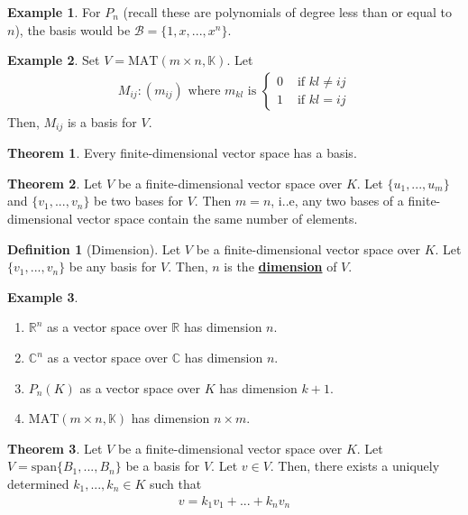 \documentclass[11pt]{scrartcl}
\newcommand{\R}[0]{\mathbb{R}}
\theoremstyle{definition}
\newtheorem{theorem}{Theorem}
\newtheorem{definition}{Definition}
\newtheorem{ex}{Example}
\theoremstyle{remark}
\newcommand{\dfn}[1]{\textbf{\underline{#1}}}
\newcommand{\C}[0]{\mathbb{C}}
\newcommand{\mat}[1]{\text{MAT}(m \times n, \mathbb{#1})}
\begin{document}
\begin{ex} 
	For $P_n$ (recall these are polynomials of degree less than or equal to $n$), the basis would be $\mathcal{B} = \{ 1, x, ..., x^n \}$. 
\end{ex}

\begin{ex} 
	Set $V = \mat{K}$. Let 
	\begin{align}
		M_{ij}: (m_{ij}) \text{ where } m_{kl} \text{ is } \begin{cases}
			0 & \text{ if } kl  \neq ij \\
			1 & \text{ if } kl = ij
		\end{cases}	
	\end{align}
	Then, $M_{ij}$ is a basis for $V$. 
\end{ex}

\begin{theorem}
	Every finite-dimensional vector space has a basis. 
\end{theorem}

\begin{theorem}
	Let $V$ be a finite-dimensional vector space over $K$. Let $\{ u_1, ..., u_m \}$ and $ \{ v_1, ..., v_n \}$ be two bases for $V$. Then $m=n$, i..e, any two bases of a finite-dimensional vector space contain the same number of elements.  
\end{theorem}

\begin{definition}[Dimension]
	Let $V$ be a finite-dimensional vector space over $K$. Let $\{ v_1, ..., v_n \}$ be any basis for $V$. Then, $n$ is the \dfn{dimension} of $V$. 
\end{definition}

\begin{ex}
	\begin{enumerate}[noitemsep]
		\item $\R^n$ as a vector space over $\R$ has dimension $n$. 
		\item $\C^n$ as a vector space over $\C$ has dimension $n$. 
		\item $P_n(K)$ as a vector space over $K$ has dimension $k+1$. 
		\item $\mat{K}$ has dimension $n \times m$. 
	\end{enumerate}	
\end{ex}

\begin{theorem}
	Let $V$ be a finite-dimensional vector space over $K$. Let $V = \text{span} \{ B_1, ..., B_n \}$ be a basis for $V$. Let $v \in V$. Then, there exists a uniquely determined $k_1, ..., k_n \in K$ such that
	\begin{align}
		v = k_1 v_1 + ... + k_n v_n 
	\end{align}
\end{theorem}
\end{document}
